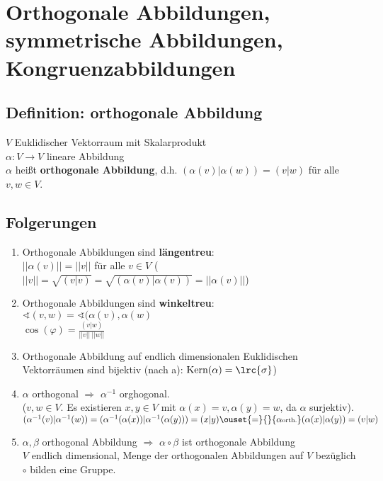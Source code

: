 \newpage
\section{Orthogonale Abbildungen, symmetrische Abbildungen, Kongruenzabbildungen}
\subsection{Definition: orthogonale Abbildung}
	$ V $ Euklidischer Vektorraum mit Skalarprodukt\\
	$ \alpha:V\rightarrow V $ lineare Abbildung\\
	$ \alpha $ heißt \textbf{orthogonale Abbildung}, d.h. $ (\alpha(v)|\alpha(w))=(v|w) $ für alle $ v,w\in V $.
	
\subsection{Folgerungen}
	\begin{enumerate}
		\item Orthogonale Abbildungen sind \textbf{längentreu}:\\
		$ ||\alpha(v)||=||v|| $ für alle $ v\in V $
		($ ||v||=\sqrt{(v|v)}=\sqrt{(\alpha(v)|\alpha(v))}=||\alpha(v)|| $)
		\item  Orthogonale Abbildungen sind \textbf{winkeltreu}:\\
		$\sphericalangle(v,w)=\sphericalangle(\alpha(v),\alpha(w)$\\
		$ \cos(\varphi)=\frac{(v|w)}{||v||\ ||w|| } $
		\item Orthogonale Abbildung auf endlich dimensionalen Euklidischen Vektorräumen sind bijektiv (nach a): $ \mbox{Kern}(\alpha)=\lrc{\sigma} $)
		\item  $ \alpha $ orthogonal $ \Rightarrow $ $ \alpha^{-1} $ orghogonal.\\
		($ v,w\in V $. Es existieren $ x,y\in V $ mit $ \alpha(x)=v,\alpha(y)=w $, da $ \alpha $ surjektiv).\\
		$( \alpha^{-1}(v)|\alpha^{-1}(w) )= (\alpha^{-1}(\alpha(x))|\alpha^{-1}(\alpha(y)))=(x|y)\ouset{=}{}{\alpha\mbox{\scriptsize orth.}}(\alpha(x)|\alpha(y))=(v|w) $
		\item  $ \alpha,\beta $ orthogonal Abbildung $ \Rightarrow $ $ \alpha\circ\beta $ ist orthogonale Abbildung\\
		$ V $ endlich dimensional, Menge der orthogonalen Abbildungen auf $ V $ bezüglich $ \circ $ bilden eine Gruppe.
	\end{enumerate}

